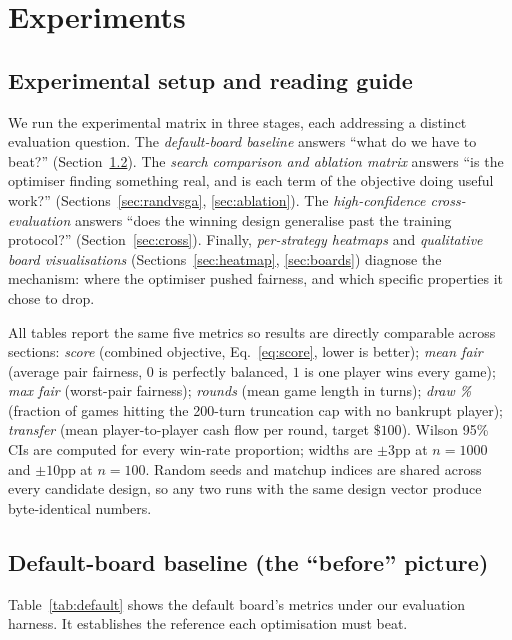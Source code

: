 \documentclass[10pt]{article}
\begin{document}
\section{Experiments}\label{sec:eval}

\subsection{Experimental setup and reading guide}

We run the experimental matrix in three stages, each addressing a
distinct evaluation question. The \emph{default-board baseline} answers
``what do we have to beat?'' (Section~\ref{sec:default}). The
\emph{search comparison and ablation matrix} answers ``is the optimiser
finding something real, and is each term of the objective doing useful
work?'' (Sections~\ref{sec:randvsga}, \ref{sec:ablation}). The
\emph{high-confidence cross-evaluation} answers ``does the winning design
generalise past the training protocol?'' (Section~\ref{sec:cross}).
Finally, \emph{per-strategy heatmaps} and
\emph{qualitative board visualisations} (Sections~\ref{sec:heatmap},
\ref{sec:boards}) diagnose the mechanism: where the optimiser pushed
fairness, and which specific properties it chose to drop.

All tables report the same five metrics so results are directly
comparable across sections: \emph{score} (combined objective,
Eq.~\ref{eq:score}, lower is better); \emph{mean fair} (average pair
fairness, $0$ is perfectly balanced, $1$ is one player wins every game);
\emph{max fair} (worst-pair fairness); \emph{rounds} (mean game length
in turns); \emph{draw \%} (fraction of games hitting the 200-turn
truncation cap with no bankrupt player); \emph{transfer} (mean
player-to-player cash flow per round, target $\$100$). Wilson 95\% CIs
are computed for every win-rate proportion; widths are $\pm 3$pp at
$n{=}1000$ and $\pm 10$pp at $n{=}100$. Random seeds and matchup indices
are shared across every candidate design, so any two runs with the same
design vector produce byte-identical numbers.

\subsection{Default-board baseline (the ``before'' picture)}\label{sec:default}

Table~\ref{tab:default} shows the default board's metrics under our
evaluation harness. It establishes the reference each optimisation must beat.
\end{document}
